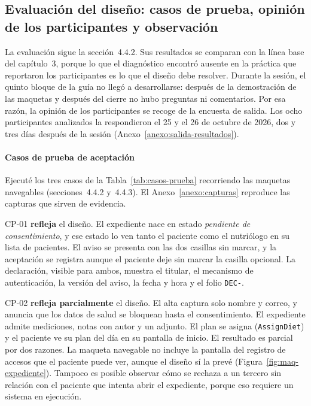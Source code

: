\documentclass[12pt, a4paper]{article}
\begin{document}
\subsection{Evaluación del diseño: casos de prueba, opinión de los participantes y observación}
 
La evaluación sigue la sección~4.4.2. Sus
resultados se comparan con la línea base del capítulo~3, porque lo que
el diagnóstico encontró ausente en la práctica que reportaron los
participantes es lo que el diseño debe resolver. Durante la sesión, el
quinto bloque de la guía no llegó a desarrollarse: después de la
demostración de las maquetas y después del cierre no hubo preguntas ni
comentarios. Por esa razón, la opinión de los participantes se recoge de la
encuesta de salida. Los ocho participantes analizados la respondieron el
25 y el 26 de octubre de 2026, dos y tres días después de la sesión
(Anexo~\ref{anexo:salida-resultados}).

\paragraph{Casos de prueba de aceptación}
Ejecuté los tres casos de la Tabla~\ref{tab:casos-prueba}
recorriendo las maquetas navegables (secciones~4.4.2 y~4.4.3). El
Anexo~\ref{anexo:capturas} reproduce las capturas que sirven de
evidencia.

CP-01 \textbf{refleja} el diseño. El expediente nace en estado
\textit{pendiente de consentimiento}, y ese estado lo ven tanto el
paciente como el nutriólogo en su lista de pacientes. El aviso se
presenta con las dos casillas sin marcar, y la aceptación se registra
aunque el paciente deje sin marcar la casilla opcional. La declaración, visible para ambos,
muestra el titular, el mecanismo de autenticación, la versión del aviso,
la fecha y hora y el folio \texttt{DEC-}.

CP-02 \textbf{refleja parcialmente} el diseño. El alta captura solo
nombre y correo, y anuncia que los datos de salud se bloquean hasta el
consentimiento. El expediente admite mediciones, notas con autor y un
adjunto. El plan se asigna (\texttt{AssignDiet}) y el paciente ve su
plan del día en su pantalla de inicio. El resultado es parcial por dos
razones. La maqueta navegable no incluye la pantalla del registro de
accesos que el paciente puede ver, aunque el diseño sí la prevé
(Figura~\ref{fig:maq-expediente}). Tampoco es posible observar cómo se rechaza a un tercero sin relación con el paciente que intenta abrir el expediente, porque eso requiere un sistema en
ejecución.
\end{document}
